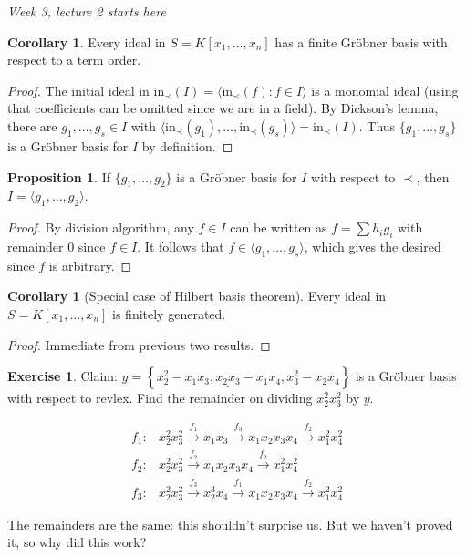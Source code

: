 \documentclass[a4paper]{article}
\newcommand{\la}{\langle}
\newcommand{\ra}{\rangle}
\newcommand{\In}{\text{in}}
\theoremstyle{definition}
\newtheorem{prop}[defn]{Proposition}
\newtheorem{coro}[defn]{Corollary}
\newtheorem{exe}[defn]{Exercise}
\begin{document}
\begin{flushright}
\textit{Week 3, lecture 2 starts here}
\end{flushright}

\begin{coro}
Every ideal in $S=K[x_1,\ldots,x_n]$ has a finite Gröbner basis with respect to a term order.
\end{coro}
\begin{proof}
The initial ideal in $\In_\prec(I)=\la \In_\prec(f):f\in I\ra$ is a monomial ideal (using that coefficients can be omitted since we are in a field). By Dickson's lemma, there are $g_1,\ldots,g_s\in I$ with $\la \In_\prec(g_1),\ldots,\In_\prec(g_s)\ra=\In_\prec(I)$. Thus $\{g_1,\ldots,g_s\}$ is a Gröbner basis for $I$ by definition.
\end{proof}

\begin{prop}
If $\{g_1,\ldots,g_2\}$ is a Gröbner basis for $I$ with respect to $\prec$, then $I=\la g_1,\ldots,g_2\ra$.
\end{prop}
\begin{proof}
By division algorithm, any $f\in I$ can be written as $f=\sum h_i g_i$ with remainder 0 since $f\in I$. It follows that $f\in\la g_1,\ldots,g_s\ra$, which gives the desired since $f$ is arbitrary.
\end{proof}

\begin{coro}[Special case of Hilbert basis theorem]
Every ideal in $S=K[x_1,\ldots,x_n]$ is finitely generated.
\end{coro}
\begin{proof}
Immediate from previous two results.
\end{proof}
\begin{exe}
Claim: $y=\left\{\underline{x_2^2}-x_1x_3,\underline{x_2x_3}-x_1x_4,\underline{x_3^2}-x_2x_4\right\}$ is a Gröbner basis with respect to revlex. Find the remainder on dividing $x_2^2x_3^2$ by $y$.

\[
\begin{aligned}
f_1:& x_2^2x_3^2 \xrightarrow{f_1} x_1x_3\xrightarrow{f_3}x_1x_2x_3x_4\xrightarrow{f_2}x_1^2x_4^2 \\
f_2:& x_2^2x_3^2 \xrightarrow{f_2} x_1x_2x_3x_4\xrightarrow{f_2} x_1^2x_4^2 \\
f_3:& x_2^2x_3^2 \xrightarrow{f_3}x_2^3x_4\xrightarrow{f_1}x_1x_2x_3x_4\xrightarrow{f_2}x_1^2x_4^2
\end{aligned}
\]

The remainders are the same: this shouldn't surprise us. But we haven't proved it, so why did this work?
\end{exe}
\end{document}
